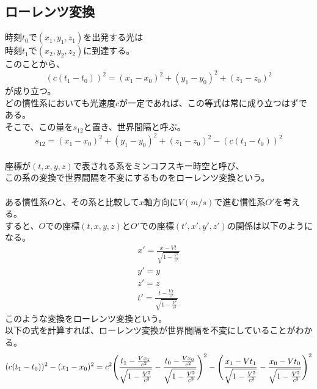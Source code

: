 \documentclass[dvipdfmx]{report} %
\begin{document}
\subsection{ローレンツ変換}
時刻$t_0$で$(x_1,y_1,z_1)$を出発する光は\\
時刻$t_1$で$(x_2,y_2,z_2)$に到達する。\\
このことから、
$$( c(t_1-t_0) )^2 = (x_1-x_0)^2 + (y_1-y_0)^2 + (z_1-z_0)^2$$
が成り立つ。\\
どの慣性系においても光速度$c$が一定であれば、この等式は常に成り立つはずである。\\
そこで、この量を$s_{12}$と置き、世界間隔と呼ぶ。\\
$$s_{12} = (x_1-x_0)^2 + (y_1-y_0)^2 + (z_1-z_0)^2 - (c(t_1-t_0))^2$$
\\
座標が$(t,x,y,z)$で表される系をミンコフスキー時空と呼び、\\
この系の変換で世界間隔を不変にするものをローレンツ変換という。\\
\\
ある慣性系$O$と、その系と比較して$x$軸方向に$V(m/s)$で進む慣性系$O'$を考える。\\
すると、$O$での座標$(t, x, y, z)$と$O'$での座標$(t', x', y', z')$の関係は以下のようになる。\\
\begin{eqnarray}
    x' = \frac{x - Vt}{\sqrt{1 - \frac{V^2}{c^2}}} \\
    y' = y \\
    z' = z \\
    t' = \frac{t - \frac{Vx}{c^2}}{\sqrt{1 - \frac{V^2}{c^2}}}
\end{eqnarray}
このような変換をローレンツ変換という。\\
以下の式を計算すれば、ローレンツ変換が世界間隔を不変にしていることがわかる。
$$
    (c(t_1-t_0))^2 - (x_1-x_0)^2 =
        c^2 \Biggl{(}\frac{t_1- \frac{Vx_1}{c^2}}{\sqrt{1-\frac{V^2}{c^2}}} - \frac{t_0- \frac{Vx_0}{c^2}}{\sqrt{1-\frac{V^2}{c^2}}} \Biggr{)} ^2 -
        \Biggl{(}\frac{x_1 - Vt_1}{\sqrt{1-\frac{V^2}{c^2}}}-\frac{x_0 - Vt_0}{\sqrt{1-\frac{V^2}{c^2}}} \Biggr{)}^2
$$
\end{document}
